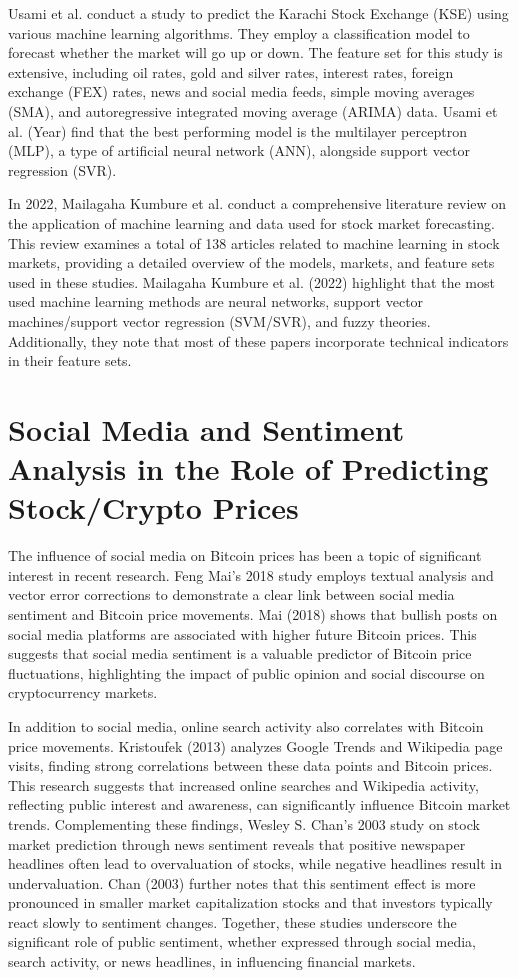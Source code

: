 Usami et al. conduct a study to predict the Karachi Stock Exchange (KSE) using various machine learning algorithms. They employ a classification model to forecast whether the market will go up or down. The feature set for this study is extensive, including oil rates, gold and silver rates, interest rates, foreign exchange (FEX) rates, news and social media feeds, simple moving averages (SMA), and autoregressive integrated moving average (ARIMA) data. Usami et al. (Year) find that the best performing model is the multilayer perceptron (MLP), a type of artificial neural network (ANN), alongside support vector regression (SVR).

In 2022, Mailagaha Kumbure et al. conduct a comprehensive literature review on the application of machine learning and data used for stock market forecasting. This review examines a total of 138 articles related to machine learning in stock markets, providing a detailed overview of the models, markets, and feature sets used in these studies. Mailagaha Kumbure et al. (2022) highlight that the most used machine learning methods are neural networks, support vector machines/support vector regression (SVM/SVR), and fuzzy theories. Additionally, they note that most of these papers incorporate technical indicators in their feature sets.

\section{Social Media and Sentiment Analysis in the Role of Predicting Stock/Crypto Prices}

The influence of social media on Bitcoin prices has been a topic of significant interest in recent research. Feng Mai's 2018 study employs textual analysis and vector error corrections to demonstrate a clear link between social media sentiment and Bitcoin price movements. Mai (2018) shows that bullish posts on social media platforms are associated with higher future Bitcoin prices. This suggests that social media sentiment is a valuable predictor of Bitcoin price fluctuations, highlighting the impact of public opinion and social discourse on cryptocurrency markets.

In addition to social media, online search activity also correlates with Bitcoin price movements. Kristoufek (2013) analyzes Google Trends and Wikipedia page visits, finding strong correlations between these data points and Bitcoin prices. This research suggests that increased online searches and Wikipedia activity, reflecting public interest and awareness, can significantly influence Bitcoin market trends. Complementing these findings, Wesley S. Chan's 2003 study on stock market prediction through news sentiment reveals that positive newspaper headlines often lead to overvaluation of stocks, while negative headlines result in undervaluation. Chan (2003) further notes that this sentiment effect is more pronounced in smaller market capitalization stocks and that investors typically react slowly to sentiment changes. Together, these studies underscore the significant role of public sentiment, whether expressed through social media, search activity, or news headlines, in influencing financial markets.

